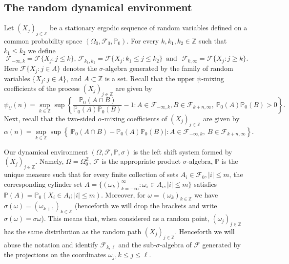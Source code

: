 \documentclass[11pt,reqno,a4paper]{article}
\theoremstyle{special}
\def\om{\omega}
\begin{document}
\subsection{The random dynamical environment}\label{Rand env}
Let $(X_j)_{j\in\mathbb Z}$ be a stationary ergodic sequence of random variables defined on a common probability space $(\Omega_0,\mathcal F_0,\mathbb P_0)$. For every $k,k_1,k_2\in\mathbb Z$ such that $k_1\leq k_2$ we define 
$$
\mathcal F_{-\infty,k}=\mathcal F\{X_j: j\leq k\},\,
\mathcal F_{k_1,k_2}=\mathcal F\{X_j:  k_1\leq j\leq k_2\}\,\text{ and }\,\, 
\mathcal F_{k,\infty}=\mathcal F\{X_j: j\geq k\}.
$$
Here $\mathcal F\{X_j: j\in A\}$ denotes the $\sigma$-algebra generated by the family of random variables $\{X_j: j\in A\}$, and $A\subset\mathbb Z$ is a set.
Recall that the upper   $\psi$-mixing coefficients  of the process $(X_j)_{j\in\mathbb Z}$ are given by 
$$
\psi_U(n)=\sup_{k\in\mathbb Z}\sup\left\{\frac{\mathbb P_0(A\cap B)}
{\mathbb P_0(A)\mathbb P_0(B)}-1:A\in\mathcal F_{-\infty,k}, 
B\in\mathcal F_{k+n,\infty}, \ \mathbb P_0(A)\mathbb P_0(B)>0\right\}.
$$
Next, recall that the two-sided  $\alpha$-mixing coefficients  of  $(X_j)_{j\in\mathbb Z}$ are given by 
\begin{equation}\label{alpha def}
\alpha(n)=\sup_{k\in\mathbb Z}\sup\left\{|\mathbb P_0(A\cap B)-\mathbb P_0(A)\mathbb P_0(B)|:A\in\mathcal F_{-\infty,k}, \ B\in\mathcal F_{k+n,\infty}\right\}.
\end{equation}

Our dynamical environment  $(\Omega,\mathcal F,\mathbb P,\sigma)$ is the left shift system formed by   $(X_j)_{j\in\mathbb Z}$. Namely, $\Omega=\Omega_0^\mathbb Z$, $\mathcal F$ is the appropriate product $\sigma$-algebra, $\mathbb P$ is the unique measure such that for every finite collection of sets $A_i\in \mathcal F_0, |i|\leq m$, the  corresponding cylinder set
$A=\{(\om_k)_{k=-\infty}^\infty: \om_i\in A_i, |i|\leq m\}$  satisfies $\mathbb P(A)=\mathbb P_0(X_i\in A_i; |i|\leq m)$. Moreover, for $\om=(\om_k)_{k\in\mathbb Z}$ we have  $\sigma(\om)=(\om_{k+1})_{k\in\mathbb Z}$ (henceforth we will drop the brackets and write $\sigma(\om)=\sigma\om$). This means that, when considered as a random point,  $(\om_j)_{j\in\mathbb Z}$ has the same distribution as the random path $(X_j)_{j\in\mathbb Z}$. Henceforth we will abuse the notation and identify $\mathcal F_{k,\ell}$ and the sub-$\sigma$-algebra of $\mathcal F$ generated by the projections on the coordinates $\om_j, k\leq j\leq \ell$.
\end{document}
